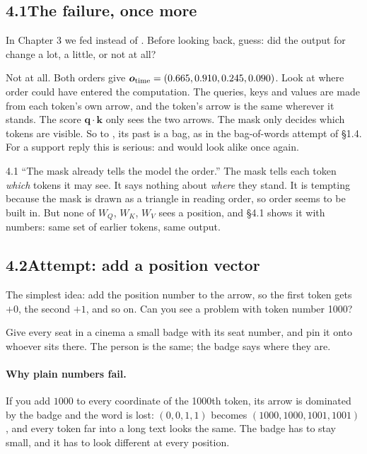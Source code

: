 \subsection*{4.1\quad The failure, once more}

\Predict In Chapter 3 we fed  instead of . Before looking back,
guess: did the output for  change a lot, a little, or not at all?

Not at all. Both orders give $\bm{o}_{\text{time}} = (0.665, 0.910, 0.245, 0.090)$. Look at where order could have entered
the computation. The queries, keys and values are made from each token's own arrow, and the token's
arrow is the same wherever it stands. The score $\bm{q}\cdot\bm{k}$ only sees the two arrows. The mask only
decides which tokens are visible. So to , its past is a bag, as in the bag-of-words attempt of
\S1.4. For a support reply this is serious:  and 
would look alike once again.

\begin{wrongidea}{4.1}
``The mask already tells the model the order.'' The mask tells each token \emph{which} tokens it may
see. It says nothing about \emph{where} they stand. It is tempting because the mask is drawn as a triangle
in reading order, so order seems to be built in. But none of $W_Q$, $W_K$, $W_V$ sees a position, and \S4.1
shows it with numbers: same set of earlier tokens, same output.
\end{wrongidea}


\subsection*{4.2\quad Attempt: add a position vector}

\Predict The simplest idea: add the position number to the arrow, so the first token gets $+0$, the
second $+1$, and so on. Can you see a problem with token number 1000?

\Picture Give every seat in a cinema a small badge with its seat number, and pin it onto whoever sits
there. The person is the same; the badge says where they are.

\paragraph{Why plain numbers fail.} If you add $1000$ to every coordinate of the 1000th token, its arrow
is dominated by the badge and the word is lost: $(0,0,1,1)$ becomes $(1000,1000,1001,1001)$, and every
token far into a long text looks the same. The badge has to stay small, and it has to look different at
every position.

